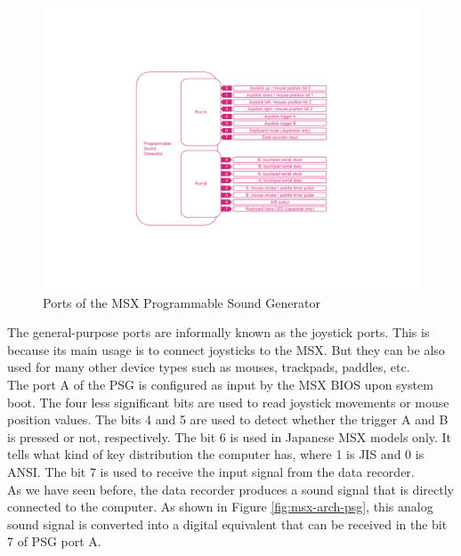 \begin{figure}
	\centering
	\includegraphics[width=1\linewidth,trim={0cm 120 0 100}]{images/figures/msx-arch-psg-ports}
	\caption{Ports of the MSX Programmable Sound Generator}
	\label{fig:msx-arch-psg-ports}
\end{figure}

The general-purpose ports are informally known as the joystick ports. This is because its main usage is to connect joysticks to the MSX. But they can be also used for many other device types such as mouses, trackpads, paddles, etc. \\

The port A of the PSG is configured as input by the MSX BIOS upon system boot. The four less significant bits are used to read joystick movements or mouse position values. The bits 4 and 5 are used to detect whether the trigger A and B is pressed or not, respectively. The bit 6 is used in Japanese MSX models only. It tells what kind of key distribution the computer has, where 1 is JIS and 0 is ANSI. The bit 7 is used to receive the input signal from the data recorder. \\

As we have seen before, the data recorder produces a sound signal that is directly connected to the computer. As shown in Figure \ref{fig:msx-arch-psg}, this analog sound signal is converted into a digital equivalent that can be received in the bit 7 of PSG port A. \\

